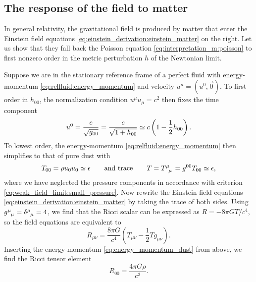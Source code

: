 \subsection{The response of the field to matter}
\label{sec:einstein_to_poisson}

In general relativity, the gravitational field is produced by matter that enter the Einstein field equations \eqref{eq:einstein_derivation:einstein_matter} on the right.
Let us show that they fall back the Poisson equation \eqref{eq:interpretation_m:poisson} to first nonzero order in the metric perturbation $h$ of the Newtonian limit.

Suppose we are in the stationary reference frame of a perfect fluid with energy-momentum \eqref{eq:relfluid:energy_momentum} and velocity $u^\mu = (u^0, \vec{0})$.
To first order in $h_{00}$, the normalization condition $u^\mu u_\mu = c^2$ then fixes the time component
\begin{equation}
	u^0 = \frac{c}{\sqrt{g_{00}}} = \frac{c}{\sqrt{1 + h_{00}}} \simeq c \left( 1 - \frac12 h_{00} \right) .
\end{equation}
To lowest order, the energy-momentum \eqref{eq:relfluid:energy_momentum} then simplifies to that of pure dust with
\begin{equation}
	T_{00} = \rho u_0 u_0 \taylor \epsilon
	\qquad \text{and trace} \qquad
	T = T\indices{^\mu_\mu} = g^{00} T_{00} \taylor \epsilon, 
\label{eq:energy_momentum_dust}
\end{equation}
where we have neglected the pressure components in accordance with criterion \eqref{eq:weak_field_limit:small_pressure}.
Now rewrite the Einstein field equations \eqref{eq:einstein_derivation:einstein_matter} by taking the trace of both sides.
Using $g\indices{^\mu_\mu} = \delta\indices{^\mu_\mu} = 4$, we find that the Ricci scalar can be expressed as $R = - 8 \pi G T / c^4$, so the field equations are equivalent to
\begin{equation}
	R_{\mu \nu} = \frac{8 \pi G}{c^4} \left( T_{\mu \nu} - \frac12 T g_{\mu \nu} \right) .
	\label{eq:einstein_rewritten}
\end{equation}
Inserting the energy-momentum \eqref{eq:energy_momentum_dust} from above, we find the Ricci tensor element
\begin{equation}
	R_{00} = \frac{4 \pi G \rho}{c^2} .
	\label{eq:weak_field_limit:ricci_from_energy_momentum}
\end{equation}

